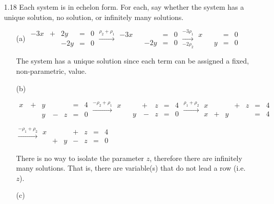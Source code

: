 \documentclass{article}
\begin{document}
\begin{enumerate}
\begin{enumerate}
\hrule

\end{enumerate}

\item[1.18] Each system is in echelon form. For each, say whether the system has a unique solution, no solution, or infinitely many solutions.

\begin{enumerate}
\item[(a)]
$\begin{aligned}
-3x&+&2y&=&0\\
&&-2y&=&0
\end{aligned}
\overset{\rho_2+\rho_1}{\longrightarrow}
\begin{aligned}
-3x&&&=&0\\
&&-2y&=&0
\end{aligned}
\underset{-2\rho_2}{\overset{-3\rho_1}{\longrightarrow}}
\begin{aligned}
x&&&=&0\\
&&y&=&0
\end{aligned}$

The system has a unique solution since each term can be assigned a fixed, non-parametric, value.

\item[(b)]

$\begin{aligned}
x&\ +&y&&&=&4\\
&&y&\ -&z&=&0
\end{aligned}
\overset{-\rho_2+\rho_1}{\longrightarrow}
\begin{aligned}
x&&&+&z&=&4\\
&&y&\ -&z&=&0
\end{aligned}
\overset{\rho_1+\rho_2}{\longrightarrow}
\begin{aligned}
x&&&+&z&=&4\\
x&+&y&&&=&4
\end{aligned}$

$\overset{-\rho_1+\rho_2}{\longrightarrow}
\begin{aligned}
x&&&+&z&=&4\\
&+&y&-&z&=&0
\end{aligned}$

There is no way to isolate the parameter $z$, therefore there are infinitely many solutions. That is, there are variable(s) that do not lead a row (i.e. $z$).

\item[(c)]


\end{enumerate}
\end{enumerate}
\end{document}
